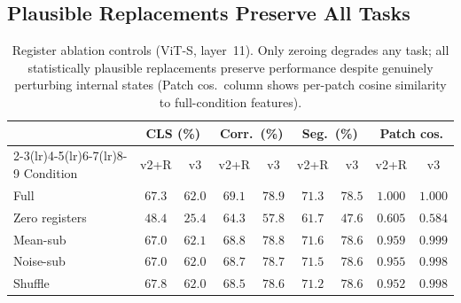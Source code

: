 \documentclass[10pt,twocolumn,letterpaper]{article}
\begin{document}
\subsection{Plausible Replacements Preserve All Tasks}
\label{sec:controls}

\begin{table}[t]
\centering
\caption{Register ablation controls (ViT-S, layer~11).
Only zeroing degrades any task; all statistically plausible replacements
preserve performance despite genuinely perturbing internal states
(Patch cos.\ column shows per-patch cosine similarity to full-condition features).}
\label{tab:controls}
\scriptsize
\setlength{\tabcolsep}{2pt}
\begin{tabular}{@{}l cc cc cc cc@{}}
\toprule
 & \multicolumn{2}{c}{CLS (\%)} & \multicolumn{2}{c}{Corr.\ (\%)} & \multicolumn{2}{c}{Seg.\ (\%)} & \multicolumn{2}{c}{Patch cos.} \\
\cmidrule(lr){2-3}\cmidrule(lr){4-5}\cmidrule(lr){6-7}\cmidrule(lr){8-9}
Condition & v2+R & v3 & v2+R & v3 & v2+R & v3 & v2+R & v3 \\
\midrule
Full            & $67.3$ & $62.0$ & $69.1$ & $78.9$ & $71.3$ & $78.5$ & $1.000$ & $1.000$ \\
Zero registers  & $48.4$ & $25.4$ & $64.3$ & $57.8$ & $61.7$ & $47.6$ & $0.605$ & $0.584$ \\
Mean-sub        & $67.0$ & $62.1$ & $68.8$ & $78.8$ & $71.6$ & $78.6$ & $0.959$ & $0.999$ \\
Noise-sub       & $67.0$ & $62.0$ & $68.7$ & $78.7$ & $71.5$ & $78.6$ & $0.955$ & $0.998$ \\
Shuffle         & $67.8$ & $62.0$ & $68.5$ & $78.6$ & $71.2$ & $78.6$ & $0.952$ & $0.998$ \\
\bottomrule
\end{tabular}
\end{table}
\end{document}
